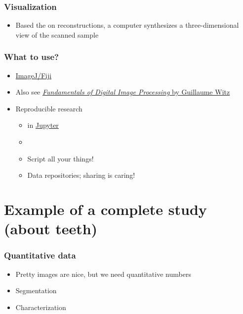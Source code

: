 \begin{frame}
	\frametitle{Visualization}
	\begin{itemize}
		\item Based the on reconstructions, a computer synthesizes a three-dimensional view of the scanned sample
	\end{itemize}
\end{frame}

\begin{frame}
	\frametitle{What to use?}
	\begin{itemize}
		\item \href{http://fiji.sc/}{ImageJ/Fiji}~\cite{Schindelin2012}
		\item Also see \href{https://ilias.unibe.ch/goto_ilias3_unibe_sess_2177933.html}{\emph{Fundamentals of Digital Image Processing} by Guillaume Witz}
		\item Reproducible research
		\begin{itemize}
			\item \href{https://www.python.org/}{\faPython} in \href{https://jupyter.org/}{Jupyter}~\cite{Kluyver2016}
			\item \href{https://git-scm.com/}{\faGit}
			\item Script all your things!
			\item Data repositories; \ie sharing is caring!
		\end{itemize}
	\end{itemize}
\end{frame}

\section{Example of a complete study (about teeth)}
\begin{frame}
	\frametitle{Quantitative data}
	\begin{itemize}
		\item Pretty images are nice, but we need quantitative numbers
		\item Segmentation
		\item Characterization
	\end{itemize}
\end{frame}

